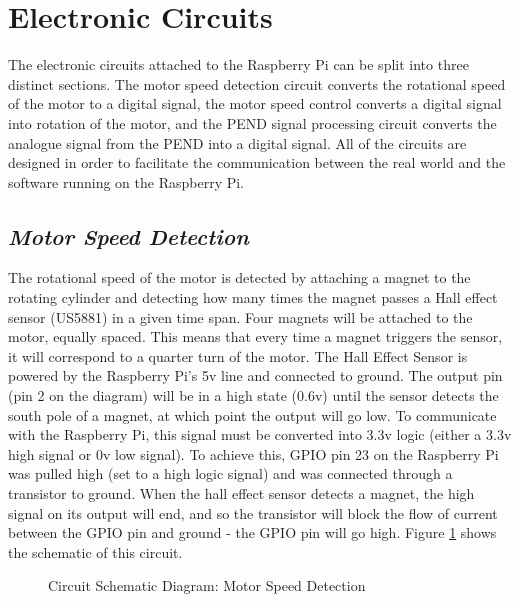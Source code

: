 \documentclass[a4]{report}
\begin{document}
	\section{Electronic Circuits}
	The electronic circuits attached to the Raspberry Pi can be split into three distinct sections. The motor speed detection circuit converts the rotational speed of the motor to a digital signal, the motor speed control converts a digital signal into rotation of the motor, and the PEND signal processing circuit converts the analogue signal from the PEND into a digital signal. All of the circuits are designed in order to facilitate the communication between the real world and the software running on the Raspberry Pi. 



	\subsection{\textit{Motor Speed Detection}}
	The rotational speed of the motor is detected by attaching a magnet to the rotating cylinder and detecting how many times the magnet passes a Hall effect sensor (US5881) in a given time span. Four magnets will be attached to the motor, equally spaced. This means that every time a magnet triggers the sensor, it will correspond to a quarter turn of the motor. The Hall Effect Sensor is powered by the Raspberry Pi's 5v line and connected to ground. The output pin (pin 2 on the diagram) will be in a high state (0.6v) until the sensor detects the south pole of a magnet, at which point the output will go low. To communicate with the Raspberry Pi, this signal must be converted into 3.3v logic (either a 3.3v high signal or 0v low signal). To achieve this, GPIO pin 23 on the Raspberry Pi was pulled high (set to a high logic signal) and was connected through a transistor to ground. When the hall effect sensor detects a magnet, the high signal on its output will end, and so the transistor will block the flow of current between the GPIO pin and ground - the GPIO pin will go high. Figure \ref{circhall} shows the schematic of this circuit. \newline
	\begin{figure}[!htb]
		\centering
		\caption{Circuit Schematic Diagram: Motor Speed Detection}
		\label{circhall}
	\end{figure} \newline  \noindent
\end{document}
